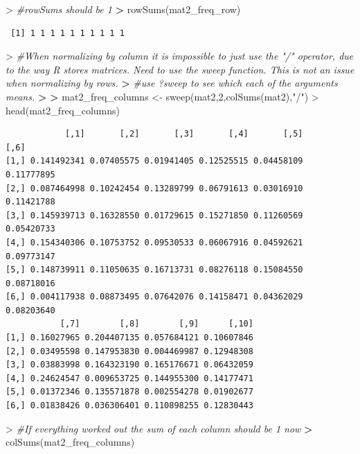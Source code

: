\documentclass[
]{book}
\newenvironment{Shaded}{\begin{snugshade}}{\end{snugshade}}
\newcommand{\CommentTok}[1]{\textcolor[rgb]{0.56,0.35,0.01}{\textit{#1}}}
\newcommand{\DecValTok}[1]{\textcolor[rgb]{0.00,0.00,0.81}{#1}}
\newcommand{\ErrorTok}[1]{\textcolor[rgb]{0.64,0.00,0.00}{\textbf{#1}}}
\newcommand{\FunctionTok}[1]{\textcolor[rgb]{0.00,0.00,0.00}{#1}}
\newcommand{\NormalTok}[1]{#1}
\newcommand{\OtherTok}[1]{\textcolor[rgb]{0.56,0.35,0.01}{#1}}
\newcommand{\SpecialCharTok}[1]{\textcolor[rgb]{0.00,0.00,0.00}{#1}}
\newcommand{\StringTok}[1]{\textcolor[rgb]{0.31,0.60,0.02}{#1}}
\theoremstyle{definition}
\theoremstyle{definition}
\theoremstyle{definition}
\theoremstyle{definition}
\theoremstyle{remark}
\begin{document}
\begin{Shaded}
\begin{Highlighting}[]
\SpecialCharTok{\textgreater{}} \CommentTok{\#rowSums should be 1}
\ErrorTok{\textgreater{}} \FunctionTok{rowSums}\NormalTok{(mat2\_freq\_row)}
\end{Highlighting}
\end{Shaded}

\begin{verbatim}
 [1] 1 1 1 1 1 1 1 1 1 1
\end{verbatim}

\begin{Shaded}
\begin{Highlighting}[]
\SpecialCharTok{\textgreater{}} \CommentTok{\#When normalizing by column it is impossible to just use the "/" operator, due to the way R stores matrices. Need to use the sweep function. This is not an issue when normalizing by rows.}
\ErrorTok{\textgreater{}} \CommentTok{\#use ?sweep to see which each of the arguments means.}
\ErrorTok{\textgreater{}} 
\ErrorTok{\textgreater{}}\NormalTok{ mat2\_freq\_columns }\OtherTok{\textless{}{-}} \FunctionTok{sweep}\NormalTok{(mat2,}\DecValTok{2}\NormalTok{,}\FunctionTok{colSums}\NormalTok{(mat2),}\StringTok{"/"}\NormalTok{)}
\SpecialCharTok{\textgreater{}} \FunctionTok{head}\NormalTok{(mat2\_freq\_columns)}
\end{Highlighting}
\end{Shaded}

\begin{verbatim}
            [,1]       [,2]       [,3]       [,4]       [,5]       [,6]
[1,] 0.141492341 0.07405575 0.01941405 0.12525515 0.04458109 0.11777895
[2,] 0.087464998 0.10242454 0.13289799 0.06791613 0.03016910 0.11421788
[3,] 0.145939713 0.16328550 0.01729615 0.15271850 0.11260569 0.05420733
[4,] 0.154340306 0.10753752 0.09530533 0.06067916 0.04592621 0.09773147
[5,] 0.148739911 0.11050635 0.16713731 0.08276118 0.15084550 0.08718016
[6,] 0.004117938 0.08873495 0.07642076 0.14158471 0.04362029 0.08203640
           [,7]        [,8]        [,9]      [,10]
[1,] 0.16027965 0.204407135 0.057684121 0.10607846
[2,] 0.03495598 0.147953830 0.004469987 0.12948308
[3,] 0.03883998 0.164323190 0.165176671 0.06432059
[4,] 0.24624547 0.009653725 0.144955300 0.14177471
[5,] 0.01372346 0.135571878 0.002554278 0.01902677
[6,] 0.01838426 0.036306401 0.110898255 0.12830443
\end{verbatim}

\begin{Shaded}
\begin{Highlighting}[]
\SpecialCharTok{\textgreater{}} \CommentTok{\#If everything worked out the sum of each column should be 1 now}
\ErrorTok{\textgreater{}} \FunctionTok{colSums}\NormalTok{(mat2\_freq\_columns)}
\end{Highlighting}
\end{Shaded}
\end{document}
